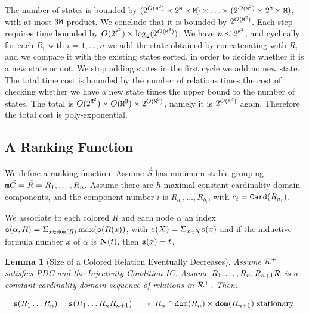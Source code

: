 \documentclass{lmcs}
\newtheorem{lemma}[theorem]{Lemma}
\begin{document}
The number of states is bounded by 
$
(2^{O({\tt M}^2)} \times 2^{\tt M} \times {\tt M})
\times \ldots \times
(2^{O({\tt M}^2)} \times 2^{\tt M} \times {\tt M})
$,
with at most $3{\tt M}$ product. 
We conclude that it is bounded by $2^{O({\tt M}^3)}$. Each step requires time bounded by
$O(2^{{\tt M}^2}) \times \log_2(2^{O({\tt M}^3)})$. 
We have $n \le 2^{{\tt M}^2}$, and cyclically 
for each $R_i$ with $i = 1, \ldots, n$ we add the state obtained by concatenating with 
$R_i$ and we compare it with the existing states sorted, in order to decide whether it is a new
state or not. We stop adding states in the first cycle we add no new state.
The total time cost is bounded by the number of relations times the cost of checking
whether we have a new state times the upper bound to the number of states.
The total is $O(2^{{\tt M}^2}) \times {O({\tt M}^3)} \times 2^{O({\tt M}^3)}$,
namely it is $2^{O({\tt M}^3)}$ again. Therefore the total cost is poly-exponential.


\subsection{A Ranking Function}
We define a ranking function. Assume $\vec{S}$ has minimum stable grouping 
${\tt m}{\vec{C}} = \vec{R} = R_1, \ldots, R_n$. Assume there are $h$ maximal
constant-cardinality domain components, and the component number $i$ is  
$R_{a_i}, \ldots ,R_{b_i}$, with $c_i  = {\tt Card}(R_{a_i})$.  

We associate to each colored $R$ and each node $\alpha$ an index ${\tt s}(\alpha, R) =
\Sigma_{x \in {\tt dom}(R)} \max({\tt s}(R(x))$, with ${\tt s}(X)=\Sigma_{x \in X} {\tt s}(x)$
and if the inductive formula number $x$ of $\alpha$ is ${\bf N}(t)$, then ${\tt s}(x) =t$.

\begin{lemma}[Size of a Colored Relation Eventually Decreases]
\label{lemma-size-colored-relation}
Assume ${\mathcal R}^+$ satisfies PDC and the Injectivity Condition IC. 
Assume $R_1, \ldots, R_n, R_{n+1} {\mathcal R}$ is a constant-cardinality-domain sequence of 
relations in ${\mathcal R}^+$. Then:

$$
{\tt s}(R_1 \ldots R_n) = {\tt s}(R_1 \ldots R_n R_{n+1})
\implies
R_n \cap {\tt dom}(R_{n}) \times {\tt dom}(R_{n+1}) \mbox{ stationary }
$$
\end{lemma}
\end{document}
